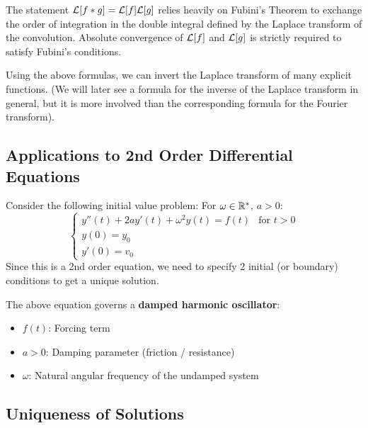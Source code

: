 \begin{verification}
The statement $\mathcal{L}[f * g] = \mathcal{L}[f] \mathcal{L}[g]$ relies heavily on Fubini's Theorem to exchange the order of integration in the double integral defined by the Laplace transform of the convolution. Absolute convergence of $\mathcal{L}[f]$ and $\mathcal{L}[g]$ is strictly required to satisfy Fubini's conditions.
\end{verification}

Using the above formulas, we can invert the Laplace transform of many explicit functions. (We will later see a formula for the inverse of the Laplace transform in general, but it is more involved than the corresponding formula for the Fourier transform).

\newpage

\subsection{Applications to 2nd Order Differential Equations}

Consider the following initial value problem: For $\omega \in \mathbb{R}^*$, $a > 0$:
\begin{equation}
\begin{cases}
y''(t) + 2a y'(t) + \omega^2 y(t) = f(t) & \text{for } t > 0 \\
y(0) = y_0 \\
y'(0) = v_0
\end{cases}
\label{eq:oscillator}
\end{equation}
Since this is a 2nd order equation, we need to specify 2 initial (or boundary) conditions to get a unique solution.

\begin{remark}
The above equation governs a \textbf{damped harmonic oscillator}:
\begin{itemize}
    \item $f(t)$: Forcing term
    \item $a > 0$: Damping parameter (friction / resistance)
    \item $\omega$: Natural angular frequency of the undamped system
\end{itemize}
\end{remark}

\subsection{Uniqueness of Solutions}


